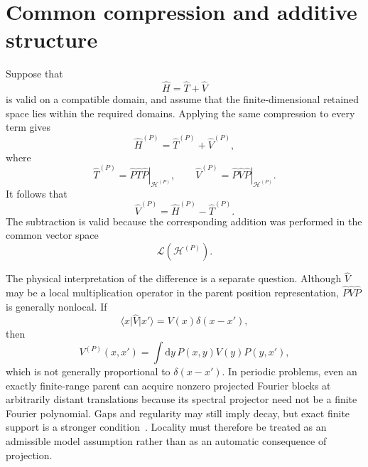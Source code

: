 \section{Common compression and additive structure}


Suppose that
\begin{equation}
    \hat H=\hat T+\hat V
\end{equation}
is valid on a compatible domain, and assume that the finite-dimensional
retained space lies within the required domains. Applying the same compression
to every term gives
\begin{equation}
    \hat H^{(P)}
    =
    \hat T^{(P)}+\hat V^{(P)},
\end{equation}
where
\begin{equation}
    \hat T^{(P)}
    =
    \left.\hat P\hat T\hat P\right|_{\mathcal H^{(P)}},
    \qquad
    \hat V^{(P)}
    =
    \left.\hat P\hat V\hat P\right|_{\mathcal H^{(P)}}.
\end{equation}
It follows that
\begin{equation}
    \hat V^{(P)}
    =
    \hat H^{(P)}-\hat T^{(P)}.
\end{equation}
The subtraction is valid because the corresponding addition was performed in
the common vector space
\begin{equation}
    \mathcal L\!\left(\mathcal H^{(P)}\right).
\end{equation}

The physical interpretation of the difference is a separate question.
Although $\hat V$ may be a local multiplication operator in the parent
position representation, $\hat P\hat V\hat P$ is generally nonlocal. If
\begin{equation}
    \langle x\rvert\hat V\lvert x'\rangle
    =
    V(x)\delta(x-x'),
\end{equation}
then
\begin{equation}
    V^{(P)}(x,x')
    =
    \int \mathrm{d}y\,
    P(x,y)V(y)P(y,x'),
\end{equation}
which is not generally proportional to $\delta(x-x')$. In periodic problems,
even an exactly finite-range parent can acquire nonzero projected Fourier blocks
at arbitrarily distant translations because its spectral projector need not be
a finite Fourier polynomial. Gaps and regularity may still imply decay, but
exact finite support is a stronger condition~\cite{desCloizeaux1964,benzi2013}.
Locality must therefore be treated as an admissible model assumption rather
than as an automatic consequence of projection.

